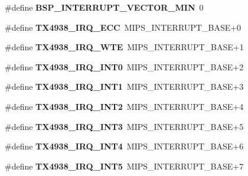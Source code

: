 \begin{DoxyCompactItemize}
\#define {\bfseries B\+S\+P\+\_\+\+I\+N\+T\+E\+R\+R\+U\+P\+T\+\_\+\+V\+E\+C\+T\+O\+R\+\_\+\+M\+IN}~0
\item 
\mbox{\label{group__bsp__interrupt_ga63a0cacc7592af02a4a31770819e3841}} 
\#define {\bfseries T\+X4938\+\_\+\+I\+R\+Q\+\_\+\+E\+CC}~M\+I\+P\+S\+\_\+\+I\+N\+T\+E\+R\+R\+U\+P\+T\+\_\+\+B\+A\+SE+0
\item 
\mbox{\label{group__bsp__interrupt_gaffd23c646e68b1514404844117595a11}} 
\#define {\bfseries T\+X4938\+\_\+\+I\+R\+Q\+\_\+\+W\+TE}~M\+I\+P\+S\+\_\+\+I\+N\+T\+E\+R\+R\+U\+P\+T\+\_\+\+B\+A\+SE+1
\item 
\mbox{\label{group__bsp__interrupt_ga1b63f7a604f426fb61766374c4505b84}} 
\#define {\bfseries T\+X4938\+\_\+\+I\+R\+Q\+\_\+\+I\+N\+T0}~M\+I\+P\+S\+\_\+\+I\+N\+T\+E\+R\+R\+U\+P\+T\+\_\+\+B\+A\+SE+2
\item 
\mbox{\label{group__bsp__interrupt_ga2312f59c8be5abef9cdf4bff1e7d1aa0}} 
\#define {\bfseries T\+X4938\+\_\+\+I\+R\+Q\+\_\+\+I\+N\+T1}~M\+I\+P\+S\+\_\+\+I\+N\+T\+E\+R\+R\+U\+P\+T\+\_\+\+B\+A\+SE+3
\item 
\mbox{\label{group__bsp__interrupt_ga2889c60c90635b639f4f036139fb0c98}} 
\#define {\bfseries T\+X4938\+\_\+\+I\+R\+Q\+\_\+\+I\+N\+T2}~M\+I\+P\+S\+\_\+\+I\+N\+T\+E\+R\+R\+U\+P\+T\+\_\+\+B\+A\+SE+4
\item 
\mbox{\label{group__bsp__interrupt_gaabb1e73cbe1757183c768db89d4f1598}} 
\#define {\bfseries T\+X4938\+\_\+\+I\+R\+Q\+\_\+\+I\+N\+T3}~M\+I\+P\+S\+\_\+\+I\+N\+T\+E\+R\+R\+U\+P\+T\+\_\+\+B\+A\+SE+5
\item 
\mbox{\label{group__bsp__interrupt_gaefd5a0d27b1cec8925416e66db0d45a4}} 
\#define {\bfseries T\+X4938\+\_\+\+I\+R\+Q\+\_\+\+I\+N\+T4}~M\+I\+P\+S\+\_\+\+I\+N\+T\+E\+R\+R\+U\+P\+T\+\_\+\+B\+A\+SE+6
\item 
\mbox{\label{group__bsp__interrupt_gab59f26d68fe5705b15f72ca7d38f8386}} 
\#define {\bfseries T\+X4938\+\_\+\+I\+R\+Q\+\_\+\+I\+N\+T5}~M\+I\+P\+S\+\_\+\+I\+N\+T\+E\+R\+R\+U\+P\+T\+\_\+\+B\+A\+SE+7
\item 

\end{DoxyCompactItemize}
